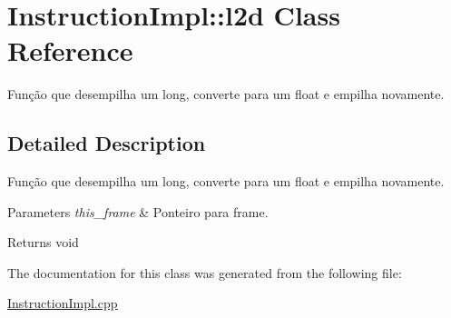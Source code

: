 \hypertarget{class_instruction_impl_1_1l2d}{}\section{Instruction\+Impl\+:\+:l2d Class Reference}
\label{class_instruction_impl_1_1l2d}


Função que desempilha um long, converte para um float e empilha novamente.  




\subsection{Detailed Description}
Função que desempilha um long, converte para um float e empilha novamente. 


\begin{DoxyParams}{Parameters}
{\em this\+\_\+frame} & Ponteiro para frame. \\
\hline
\end{DoxyParams}
\begin{DoxyReturn}{Returns}
void 
\end{DoxyReturn}


The documentation for this class was generated from the following file\+:\begin{DoxyCompactItemize}
\item 
\hyperlink{_instruction_impl_8cpp}{Instruction\+Impl.\+cpp}\end{DoxyCompactItemize}

